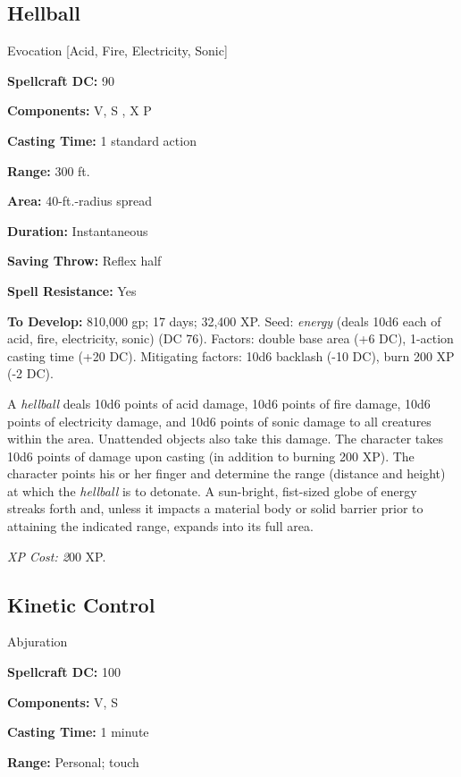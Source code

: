 \documentclass{article}
\begin{document}
\vspace{12pt}
\subsection*{Hellball }

Evocation [Acid, Fire, Electricity, Sonic] 

\textbf{Spellcraft DC:} 90 

\textbf{Components:} V, S , X P 

\textbf{Casting Time:} 1 standard action 

\textbf{Range:} 300 ft. 

\textbf{Area:} 40-ft.-radius spread 

\textbf{Duration:} Instantaneous 

\textbf{Saving Throw:} Reflex half 

\textbf{Spell Resistance:} Yes 

\textbf{To Develop:} 810,000 gp; 17 days; 32,400 XP. Seed: \textit{energy }(deals 
10d6 each of acid, fire, electricity, sonic) (DC 76). Factors: double base area 
(+6 DC), 1-action casting time (+20 DC). Mitigating factors: 10d6 backlash (-10 
DC), burn 200 XP (-2 DC).

A \textit{hellball} deals 10d6 points of acid damage, 10d6 points of fire damage, 
10d6 points of electricity damage, and 10d6 points of sonic damage to all creatures 
within the area. Unattended objects also take this damage. The character takes 
10d6 points of damage upon casting (in addition to burning 200 XP). The character 
points his or her finger and determine the range (distance and height) at which 
the \textit{hellball }is to detonate. A sun-bright, fist-sized globe of energy 
streaks forth and, unless it impacts a material body or solid barrier prior to 
attaining the indicated range, expands into its full area.

\textit{XP Cost: 2}00 XP. 

\vspace{12pt}
\subsection*{Kinetic Control }

Abjuration 

\textbf{Spellcraft DC:} 100 

\textbf{Components:} V, S 

\textbf{Casting Time:} 1 minute 

\textbf{Range:} Personal; touch 
\end{document}
